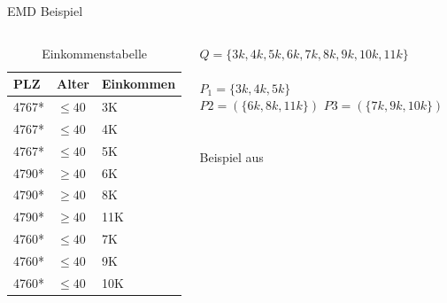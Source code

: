 \begin{frame} {EMD Beispiel}
	
	\begin{columns}[T]
		\begin{column}{0.5\textwidth}
			\begin{table}[]
				\centering
				\label{tclossenessExample}
				\begin{tabular}{|l|l|l|}
					\hline
					\textbf{PLZ}   & \textbf{Alter}    & \textbf{Einkommen} \\\hline
					4767* & $\le 40$ & 3K \\
					4767* & $\le 40$ & 4K \\
					4767* & $\le 40$ & 5K \\\hline
					4790* & $\ge 40$ & 6K \\
					4790* & $\ge 40$ & 8K \\
					4790* & $\ge 40$ & 11K \\\hline
					4760* & $\le 40$ & 7K \\
					4760* & $\le 40$ & 9K \\
					4760* & $\le 40$ & 10K \\\hline
				\end{tabular}
				\caption{Einkommenstabelle}
			\end{table}
		\end{column}
		
		\begin{column}{0.5\textwidth}
			$Q = \{3k, 4k, 5k, 6k, 7k, 8k, 9k, 10k, 11k\}$\\
			\ \\
			$P_1 = \{3k, 4k, 5k\}$ \\
			$P2 = (\{6k, 8k, 11k\})$ 
			$P3 = (\{7k, 9k, 10k\})$
			\ \\
			\ \\
			\tiny Beispiel aus \cite{Li2007t-closseness}
		\end{column}
	\end{columns}
\end{frame}
